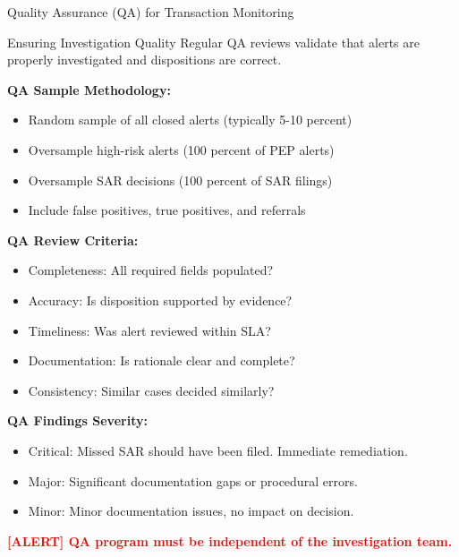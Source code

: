 \documentclass[11pt,a4paper]{beamer}
\newcommand{\redflag}[1]{\textcolor{red}{\textbf{[ALERT] #1}}}
\begin{document}
	\begin{frame}{Quality Assurance (QA) for Transaction Monitoring}
	\begin{block}{Ensuring Investigation Quality}
		Regular QA reviews validate that alerts are properly investigated and dispositions are correct.
	\end{block}
	
	\textbf{QA Sample Methodology:}
	\begin{itemize}
		\item Random sample of all closed alerts (typically 5-10 percent)
		\item Oversample high-risk alerts (100 percent of PEP alerts)
		\item Oversample SAR decisions (100 percent of SAR filings)
		\item Include false positives, true positives, and referrals
	\end{itemize}
	
	\textbf{QA Review Criteria:}
	\begin{itemize}
		\item Completeness: All required fields populated?
		\item Accuracy: Is disposition supported by evidence?
		\item Timeliness: Was alert reviewed within SLA?
		\item Documentation: Is rationale clear and complete?
		\item Consistency: Similar cases decided similarly?
	\end{itemize}
	
	\textbf{QA Findings Severity:}
	\begin{itemize}
		\item Critical: Missed SAR should have been filed. Immediate remediation.
		\item Major: Significant documentation gaps or procedural errors.
		\item Minor: Minor documentation issues, no impact on decision.
	\end{itemize}
	
	\redflag{QA program must be independent of the investigation team.}
	\end{frame}
	
\end{document}

